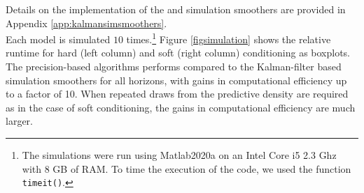 \documentclass[notitlepage,a4paper,12pt]{article}
\begin{document}
\begin{ThreePartTable}
Details on the implementation of the \citet{carterkohn1994_biomtr} and \citet{durbinkoopman2002_biomtr} simulation smoothers are provided in Appendix \ref{app:kalmansimsmoothers}.\\

Each model is simulated $10$ times.\footnote{The simulations were run using Matlab2020a on an Intel Core i5 2.3 Ghz with 8 GB of RAM. To time the execution of the code, we used the function \texttt{timeit()}.} Figure \ref{figsimulation} shows the relative runtime for hard (left column) and soft (right column) conditioning as boxplots. The precision-based algorithms performs compared to the Kalman-filter based simulation smoothers for all horizons, with gains in computational efficiency up to a factor of 10. When repeated draws from the predictive density are required as in the case of soft conditioning, the gains in computational efficiency are much larger.


\end{ThreePartTable}
\end{document}
